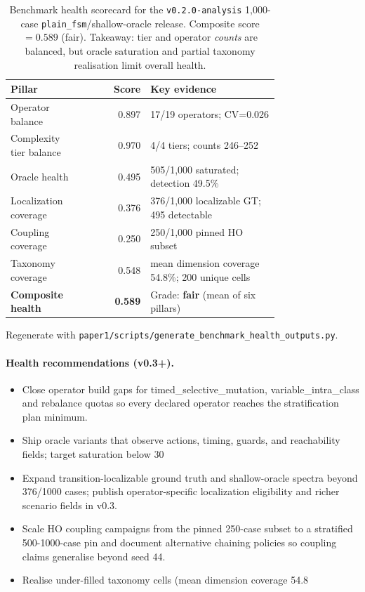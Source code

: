 \begin{table}[t]
\caption{Benchmark health scorecard for the \texttt{v0.2.0-analysis} 1{,}000-case \texttt{plain\_fsm}/shallow-oracle release. Composite score $=0.589$ (fair). Takeaway: tier and operator \emph{counts} are balanced, but oracle saturation and partial taxonomy realisation limit overall health.}
\label{tab:benchmark-health}
\small
\begin{tabular}{@{}p{0.28\linewidth}rp{0.48\linewidth}@{}}
\toprule
Pillar & Score & Key evidence \\
\midrule
Operator balance & 0.897 & 17/19 operators; CV=0.026 \\
Complexity tier balance & 0.970 & 4/4 tiers; counts 246--252 \\
Oracle health & 0.495 & 505/1{,}000 saturated; detection 49.5\% \\
Localization coverage & 0.376 & 376/1{,}000 localizable GT; 495 detectable \\
Coupling coverage & 0.250 & 250/1{,}000 pinned HO subset \\
Taxonomy coverage & 0.548 & mean dimension coverage 54.8\%; 200 unique cells \\
\midrule
\textbf{Composite health} & \textbf{0.589} & Grade: \textbf{fair} (mean of six pillars) \\
\bottomrule
\end{tabular}
\par\footnotesize Regenerate with \texttt{paper1/scripts/generate\_benchmark\_health\_outputs.py}.
\end{table}

\paragraph{Health recommendations (v0.3+).}
\begin{itemize}[leftmargin=*]
\item Close operator build gaps for timed\_selective\_mutation, variable\_intra\_class and rebalance quotas so every declared operator reaches the stratification plan minimum.
\item Ship oracle variants that observe actions, timing, guards, and reachability fields; target saturation below 30%
\item Expand transition-localizable ground truth and shallow-oracle spectra beyond 376/1000 cases; publish operator-specific localization eligibility and richer scenario fields in v0.3.
\item Scale HO coupling campaigns from the pinned 250-case subset to a stratified 500-1000-case pin and document alternative chaining policies so coupling claims generalise beyond seed 44.
\item Realise under-filled taxonomy cells (mean dimension coverage 54.8%
\end{itemize}
